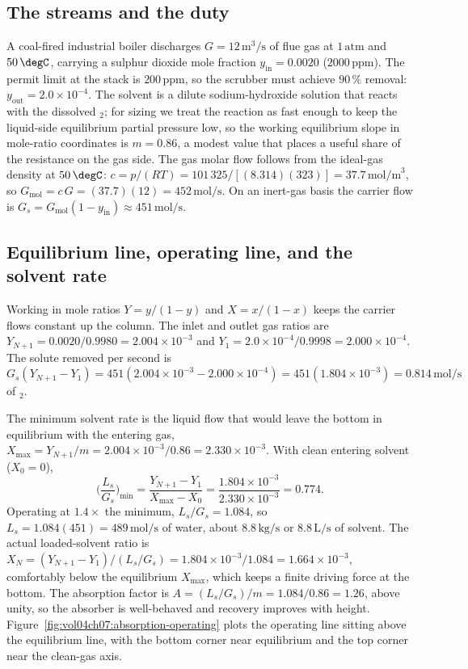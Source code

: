 \subsection{The streams and the duty}

A coal-fired industrial boiler discharges $G = 12\,\text{m}^3/\text{s}$
of flue gas at $1\,\text{atm}$ and $50\,\degC$, carrying a sulphur
dioxide mole fraction $y_{\text{in}} = 0.0020$ ($2000\,\text{ppm}$).
The permit limit at the stack is $200\,\text{ppm}$, so the scrubber must
achieve $90\,\%$ removal: $y_{\text{out}} = 2.0\times 10^{-4}$. The
solvent is a dilute sodium-hydroxide solution that reacts with the
dissolved $_2$; for sizing we treat the reaction as fast enough
to keep the liquid-side equilibrium partial pressure low, so the working
equilibrium slope in mole-ratio coordinates is $m = 0.86$, a modest
value that places a useful share of the resistance on the gas side. The
gas molar flow follows from the ideal-gas density at $50\,\degC$:
$c = p/(RT) = 101\,325/[(8.314)(323)] = 37.7\,\text{mol/m}^3$, so
$G_{\text{mol}} = c\,G = (37.7)(12) = 452\,\text{mol/s}$. On an
inert-gas basis the carrier flow is $G_s = G_{\text{mol}}(1 -
y_{\text{in}}) \approx 451\,\text{mol/s}$.

\subsection{Equilibrium line, operating line, and the solvent rate}

Working in mole ratios $Y = y/(1-y)$ and $X = x/(1-x)$ keeps the carrier
flows constant up the column. The inlet and outlet gas ratios are
$Y_{N+1} = 0.0020/0.9980 = 2.004\times 10^{-3}$ and $Y_1 = 2.0\times
10^{-4}/0.9998 = 2.000\times 10^{-4}$. The solute removed per second is
$G_s(Y_{N+1}-Y_1) = 451(2.004\times 10^{-3} - 2.000\times 10^{-4}) =
451(1.804\times 10^{-3}) = 0.814\,\text{mol/s}$ of $_2$.

The minimum solvent rate is the liquid flow that would leave the bottom
in equilibrium with the entering gas, $X_{\max} = Y_{N+1}/m =
2.004\times 10^{-3}/0.86 = 2.330\times 10^{-3}$. With clean entering
solvent ($X_0 = 0$),
\[
\Big(\frac{L_s}{G_s}\Big)_{\min} = \frac{Y_{N+1}-Y_1}{X_{\max}-X_0} =
\frac{1.804\times 10^{-3}}{2.330\times 10^{-3}} = 0.774.
\]
Operating at $1.4\times$ the minimum, $L_s/G_s = 1.084$, so
$L_s = 1.084(451) = 489\,\text{mol/s}$ of water, about $8.8\,\text{kg/s}$
or $8.8\,\text{L/s}$ of solvent. The actual loaded-solvent ratio is
$X_N = (Y_{N+1}-Y_1)/(L_s/G_s) = 1.804\times 10^{-3}/1.084 =
1.664\times 10^{-3}$, comfortably below the equilibrium $X_{\max}$, which
keeps a finite driving force at the bottom. The absorption factor is
$A = (L_s/G_s)/m = 1.084/0.86 = 1.26$, above unity, so the absorber is
well-behaved and recovery improves with height.
Figure~\ref{fig:vol04ch07:absorption-operating} plots the operating line
sitting above the equilibrium line, with the bottom corner near
equilibrium and the top corner near the clean-gas axis.

